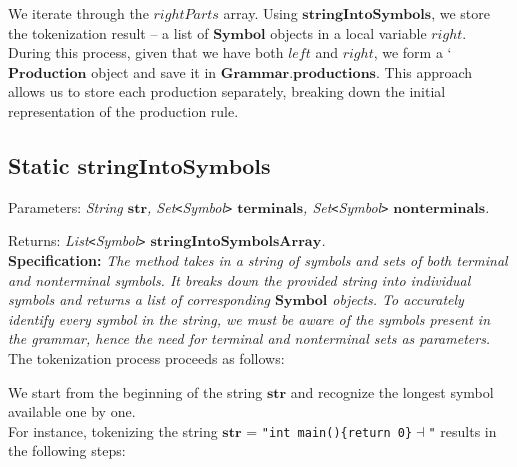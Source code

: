 We iterate through the \(rightParts\) array. Using \(\boldsymbol{stringIntoSymbols}\), we store the tokenization result – a list of \(\boldsymbol{Symbol}\) objects in a local variable \(right\). During this process, given that we have both \(left\) and \(right\), we form a ‘\(\boldsymbol{Production}\) object and save it in \(\boldsymbol{Grammar.productions}\). This approach allows us to store each production separately, breaking down the initial representation of the production rule.

\vspace{30pt}

\subsection*{Static \(\boldsymbol{stringIntoSymbols}\)}

Parameters: \textit{String \(\boldsymbol{str}\), Set\texttt{<}Symbol\texttt{>} \(\boldsymbol{terminals}\), Set\texttt{<}Symbol\texttt{>} \(\boldsymbol{nonterminals}\).}

Returns: \textit{ List\texttt{<}Symbol\texttt{>} \(\boldsymbol{stringIntoSymbolsArray}\).}\\

\textbf{Specification:} \textit{The method takes in a string of symbols and sets of both terminal and nonterminal symbols. It breaks down the provided string into individual symbols and returns a list of corresponding \(\boldsymbol{Symbol}\) objects. To accurately identify every symbol in the string, we must be aware of the symbols present in the grammar, hence the need for terminal and nonterminal sets as parameters.}\\

The tokenization process proceeds as follows:

We start from the beginning of the string \(\boldsymbol{str}\) and recognize the longest symbol available one by one.\\

For instance, tokenizing the string \(\boldsymbol{str}\) = \texttt{"int main()\{return 0\}\( \dashv \)"} results in the following steps:

